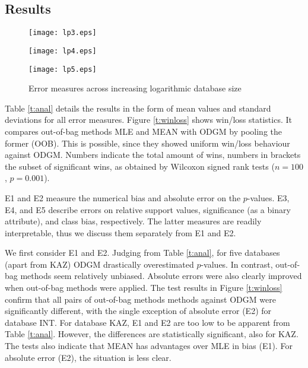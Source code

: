 \documentclass{sig-alternate}
\begin{document}
\subsection{Results}

\label{ss:Results}
\begin{figure*}[t]
  \begin{minipage}[h]{5.5cm}
    \texttt{[image: lp3.eps]}
  \end{minipage}
  \begin{minipage}[h]{5.5cm}
    \texttt{[image: lp4.eps]}
  \end{minipage}
  \begin{minipage}[h]{5.5cm}
    \texttt{[image: lp5.eps]}
  \end{minipage}
  \caption{Error measures across increasing logarithmic database size}
  \label{fig:lp}
\end{figure*}
Table \ref{t:anal} details the results in the form of mean values and standard
deviations for all error measures. 
Figure
\ref{t:winloss} shows win/loss statistics. It compares out-of-bag methods MLE
and MEAN with ODGM by pooling the former (OOB). This is possible, since they
showed uniform win/loss behaviour against ODGM.
Numbers indicate the total amount of wins, numbers in brackets the
subset of significant wins, as obtained by Wilcoxon signed rank tests ($n=100$, $p=0.001$).

E1 and E2 measure the numerical bias and absolute error on the $p$-values. E3, E4, and E5 describe errors on
relative support values, significance (as a binary attribute), and class bias,
respectively. The latter measures are readily interpretable, thus we discuss
them separately from E1 and E2.

We first consider E1 and E2. Judging from Table \ref{t:anal}, for five databases
(apart from KAZ) ODGM drastically overestimated $p$-values. In contrast,
out-of-bag methods seem relatively unbiased. Absolute errors were also clearly improved when out-of-bag
methods were applied. 
The test results in Figure \ref{t:winloss} confirm that all pairs of out-of-bag methods methods against 
ODGM were significantly different, with the single exception of absolute error (E2) for database INT. 
For database KAZ, E1 and E2 are too low to be apparent from Table \ref{t:anal}. However,
the differences are statistically significant, also for KAZ.
The tests also indicate that MEAN has
advantages over MLE in bias (E1). For absolute error (E2), the situation is less clear. 
\end{document}

